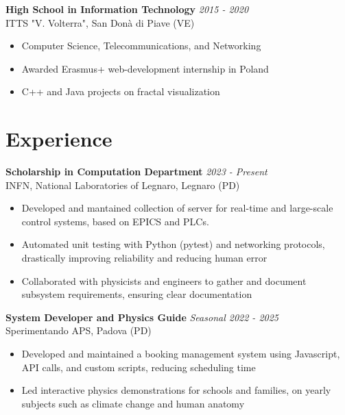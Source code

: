 \documentclass[a4paper,10pt]{article}
\begin{document}
\begin{minipage}[t]{0.58\textwidth}
        \textbf{High School in Information Technology} \hfill \textit{2015 - 2020} \\
        ITTS "V. Volterra", San Donà di Piave (VE) %
        \vspace{-0.1cm}
        \begin{itemize}[left=0.2cm, label={\textbullet}, itemsep=0cm]
            \item Computer Science, Telecommunications, and Networking
            \item Awarded Erasmus+ web-development internship in Poland
            \item C++ and Java projects on fractal visualization
        \end{itemize}

    \section*{Experience}
        \textbf{Scholarship in Computation Department}  \hfill \textit{2023 - Present} \\
        INFN, National Laboratories of Legnaro, Legnaro (PD)
        \vspace{-0.1cm}
        \begin{itemize}[left=0.2cm, label={\textbullet}, itemsep=0cm]
            \item Developed and mantained collection of server for real-time and large-scale control systems, based on EPICS and PLCs.
            \item Automated unit testing with Python (pytest) and networking protocols, drastically improving reliability and reducing human error
            \item Collaborated with physicists and engineers to gather and document subsystem requirements, ensuring clear documentation
        \end{itemize}
        \vspace{0.2cm}
        
        \textbf{System Developer and Physics Guide}  \hfill \textit{Seasonal 2022 - 2025} \\
        Sperimentando APS, Padova (PD)
        \vspace{-0.1cm}
        \begin{itemize}[left=0.2cm, label={\textbullet}, itemsep=0cm]
            \item Developed and maintained a booking management system using Javascript, API calls, and custom scripts, reducing scheduling time
            \item Led interactive physics demonstrations for schools and families, on yearly subjects such as climate change and human anatomy
        \end{itemize}


\end{minipage}
\end{document}
